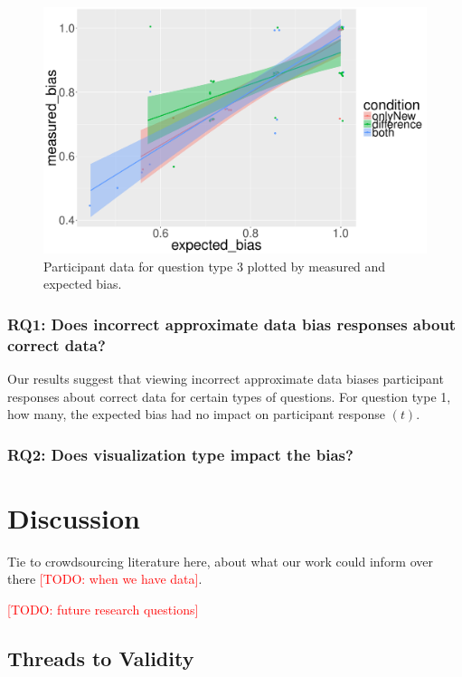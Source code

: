 \documentclass[10pt,journal,compsoc]{IEEEtran}
\newcommand{\note}[2]{\textcolor{#1}{[#2]}}
\newcommand{\todo}[1]{\note{red}{TODO: #1}}
\begin{document}
\begin{figure}[!t]
  \centering
  \includegraphics[width=\columnwidth]{jaccard_precise_jitter.pdf}
  \caption{Participant data for question type 3 plotted by measured and expected bias.}
  \label{figure_q3}
\end{figure}

\subsubsection{RQ1: Does incorrect approximate data bias responses about correct data?}

Our results suggest that viewing incorrect approximate data biases participant responses about correct data for certain types of questions.
For question type 1, how many, the expected bias had no impact on participant response $(t)$.


\subsubsection{RQ2: Does visualization type impact the bias?}

\section{Discussion}\label{sec:discussion}

Tie to crowdsourcing literature here, about what our work could inform over there \todo{when we have data}.

\todo{future research questions}

\subsection{Threads to Validity} %
\end{document}
